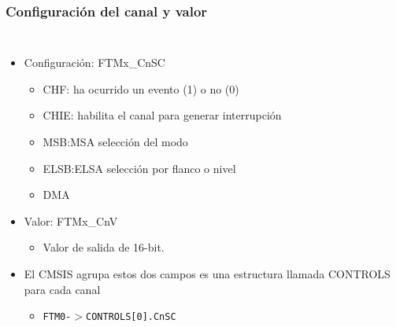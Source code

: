 \documentclass[10.5pt,scale=1.0,t,aspectratio=169,hyperref={pdfpagelabels=false}]{beamer}
\begin{document}
\begin{frame}
	\frametitle{Configuración del canal y valor}
	\vspace{-0.3cm}
	{\footnotesize
		\begin{columns}
			\begin{itemize}
				\item Configuración: FTMx\_CnSC
				\begin{itemize}
					\item CHF: ha ocurrido un evento (1) o no (0)
					\item CHIE: habilita el canal para generar interrupción
					\item MSB:MSA selección del modo
					\item ELSB:ELSA selección por flanco o nivel
					\item DMA
				\end{itemize}
				\item Valor: FTMx\_CnV
				\begin{itemize}
					\item Valor de salida de 16-bit.
				\end{itemize}
				\item El CMSIS agrupa estos dos campos es una estructura llamada CONTROLS para cada canal
				\begin{itemize}
					\item \texttt{FTM0-$>$CONTROLS[0].CnSC}
				\end{itemize}
			\end{itemize}
		

\end{columns}}
\end{frame}
\end{document}
